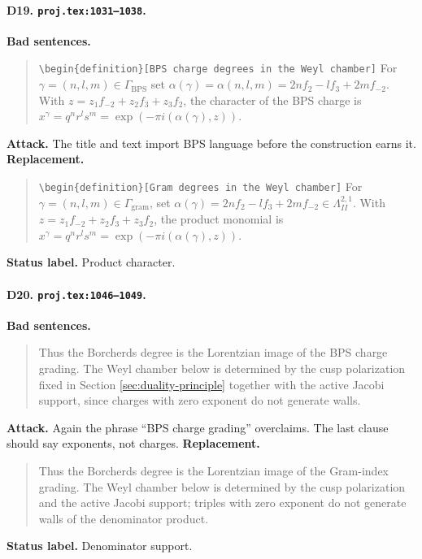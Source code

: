 \paragraph{D19. \texttt{proj.tex:1031--1038}.}
\textbf{Bad sentences.}
\begin{quote}\small
\texttt{\textbackslash begin\{definition\}[BPS charge degrees in the Weyl chamber]}
For \(\gamma=(n,l,m)\in\Gamma_{\mathrm{BPS}}\) set
\(\alpha(\gamma)=\alpha(n,l,m)=2nf_2-lf_3+2mf_{-2}\).
With \(z=z_1f_{-2}+z_2f_3+z_3f_2\), the character of the BPS charge is
\(x^\gamma=q^nr^ls^m=\exp(-\pi i(\alpha(\gamma),z))\).
\end{quote}
\textbf{Attack.}
The title and text import BPS language before the construction earns it.
\textbf{Replacement.}
\begin{quote}\small
\texttt{\textbackslash begin\{definition\}[Gram degrees in the Weyl chamber]}
For \(\gamma=(n,l,m)\in\Gamma_{\mathrm{gram}}\), set
\(\alpha(\gamma)=2nf_2-lf_3+2mf_{-2}\in\Lambda^{2,1}_{II}\).
With \(z=z_1f_{-2}+z_2f_3+z_3f_2\), the product monomial is
\(x^\gamma=q^nr^ls^m=\exp(-\pi i(\alpha(\gamma),z))\).
\end{quote}
\textbf{Status label.} Product character.

\paragraph{D20. \texttt{proj.tex:1046--1049}.}
\textbf{Bad sentences.}
\begin{quote}\small
Thus the Borcherds degree is the Lorentzian image of the BPS charge
grading.  The Weyl chamber below is determined by the cusp polarization
fixed in Section \ref{sec:duality-principle} together with the active
Jacobi support, since charges with zero exponent do not generate walls.
\end{quote}
\textbf{Attack.}
Again the phrase ``BPS charge grading'' overclaims.  The last clause
should say exponents, not charges.
\textbf{Replacement.}
\begin{quote}\small
Thus the Borcherds degree is the Lorentzian image of the Gram-index
grading.  The Weyl chamber below is determined by the cusp polarization
and the active Jacobi support; triples with zero exponent do not generate
walls of the denominator product.
\end{quote}
\textbf{Status label.} Denominator support.

